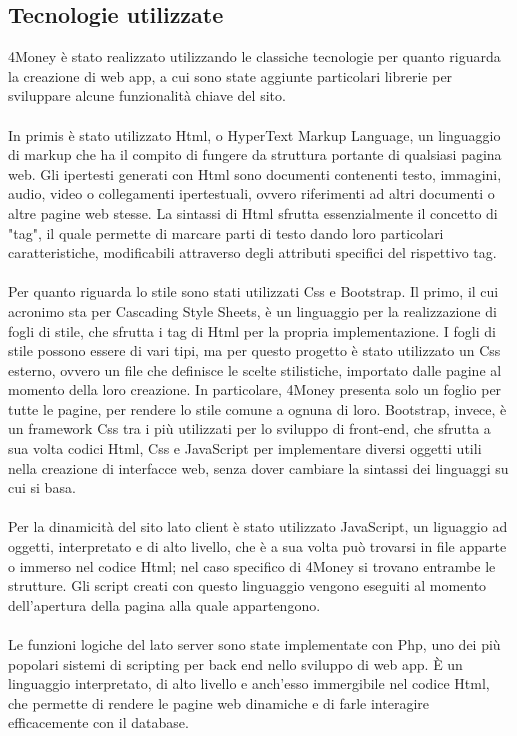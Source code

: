 \documentclass[binding=0.6cm, oneside, noexaminfo, italian]{sapthesis}
\begin{document}
\subsection{Tecnologie utilizzate}
4Money è stato realizzato utilizzando le classiche tecnologie per quanto riguarda la creazione di web app, a cui sono state aggiunte particolari librerie per sviluppare alcune funzionalità chiave del sito. \\ \\
In primis è stato utilizzato Html, o HyperText Markup Language, un linguaggio di markup che ha il compito di fungere da struttura portante di qualsiasi pagina web. Gli ipertesti generati con Html sono documenti contenenti testo, immagini, audio, video o collegamenti ipertestuali, ovvero riferimenti ad altri documenti o altre pagine web stesse. La sintassi di Html sfrutta essenzialmente il concetto di "tag", il quale permette di marcare parti di testo dando loro particolari caratteristiche, modificabili attraverso degli attributi specifici del rispettivo tag. \\ \\
Per quanto riguarda lo stile sono stati utilizzati Css e Bootstrap. Il primo, il cui acronimo sta per Cascading Style Sheets, è un linguaggio per la realizzazione di fogli di stile, che sfrutta i tag di Html per la propria implementazione. I fogli di stile possono essere di vari tipi, ma per questo progetto è stato utilizzato un Css esterno, ovvero un file che definisce le scelte stilistiche, importato dalle pagine al momento della loro creazione. In particolare, 4Money presenta solo un foglio per tutte le pagine, per rendere lo stile comune a ognuna di loro. Bootstrap, invece, è un framework Css tra i più utilizzati per lo sviluppo di front-end, che sfrutta a sua volta codici Html, Css e JavaScript per implementare diversi oggetti utili nella creazione di interfacce web, senza dover cambiare la sintassi dei linguaggi su cui si basa. \\ \\
Per la dinamicità del sito lato client è stato utilizzato JavaScript, un liguaggio ad oggetti, interpretato e di alto livello, che è a sua volta può trovarsi in file apparte o immerso nel codice Html; nel caso specifico di 4Money si trovano entrambe le strutture. Gli script creati con questo linguaggio vengono eseguiti al momento dell'apertura della pagina alla quale appartengono. \\ \\
Le funzioni logiche del lato server sono state implementate con Php, uno dei più popolari sistemi di scripting per back end nello sviluppo di web app. \MakeUppercase{è} un linguaggio interpretato, di alto livello e anch'esso immergibile nel codice Html, che permette di rendere le pagine web dinamiche e di farle interagire efficacemente con il database. \\ \\
\end{document}
